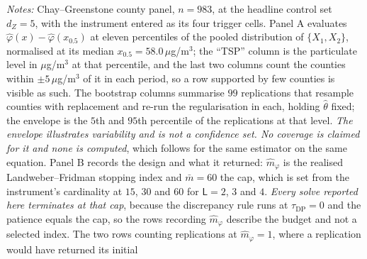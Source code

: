 \documentclass[
  12pt]{article}
\newcommand{\1}[1]{\mathds{1}\left[#1\right]}
\theoremstyle{plain}
\theoremstyle{definition}
\theoremstyle{definition}
\theoremstyle{remark}
\begin{document}
%
%
%
\begin{table}
\centering
\begin{threeparttable}
\caption{The estimated hedonic price function and its bootstrap variability}
\label{tab:app-phi}
\tiny
\setlength{\tabcolsep}{3pt}

\begin{tablenotes}\scriptsize
\item \textit{Notes:} Chay--Greenstone county panel, $n=983$, at the headline
control set $d_Z=5$, with the instrument entered as its four trigger cells. Panel
A evaluates $\hat\varphi(x)-\hat\varphi(x_{0.5})$ at
eleven percentiles of the pooled distribution of $\{X_1,X_2\}$, normalised at
its median $x_{0.5}=58.0\,\mu$g/m$^3$; the ``TSP'' column is the particulate
level in $\mu$g/m$^3$ at that percentile, and the last two columns count the
counties within $\pm5\,\mu$g/m$^3$ of it in each period, so a row supported by
few counties is visible as such. The bootstrap columns summarise $99$
replications that resample counties with replacement and re-run the
regularisation in each, holding $\hat\theta$ fixed; the envelope is the $5$th
and $95$th percentile of the
replications at that level. \emph{The envelope illustrates variability and is
not a confidence set. No coverage is claimed for it and none is computed}, which
follows \citet{centorrinofeveflorens2019} for the same estimator on the same
equation. Panel B records the design and what it returned: $\hat m_\varphi$ is
the realised Landweber--Fridman stopping index and $\bar m=60$ the cap, which is
set from the instrument's cardinality at $15$, $30$ and $60$ for
$\mathsf L=2$, $3$ and $4$. \emph{Every solve reported here terminates at that
cap}, because the discrepancy rule runs at $\tau_{\mathrm{DP}}=0$ and the
patience equals the cap, so the rows recording $\hat m_\varphi$ describe the
budget and not a selected index. The two rows counting replications at
$\hat m_\varphi=1$, where a replication would have returned its initial

\end{tablenotes}
\end{threeparttable}
\end{table}
\end{document}
